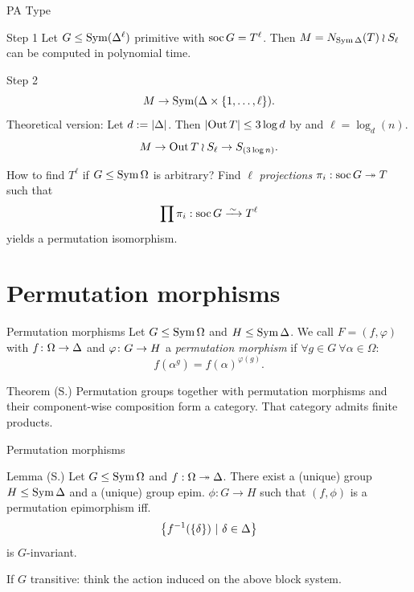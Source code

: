 \documentclass{beamer}
\theoremstyle{plain}
\theoremstyle{definition}
\begin{document}
\begin{frame}{PA Type}
\begin{block}{Step 1}
Let $G \leq \operatorname{Sym}(\Delta ^ \ell)$ primitive with
$\operatorname{soc} G = T ^ \ell$.
Then $M = N_{\operatorname{Sym} \Delta}(T) \wr S_\ell$ can be computed in polynomial
time.
\end{block}
\vspace{1em}

\pause
\begin{block}{Step 2}
\vspace{-1em}
\[
    M \rightarrow \operatorname{Sym}( \Delta \times  \left\{ 1, \ldots, \ell \right\}  ).
\]
\pause
Theoretical version: Let $d :=  \left| \Delta \right| $.
Then $ \left| \operatorname{Out} T \right|  \leq 3 \log d$ by
\cite{guralnick-maroti-pyber:normalizers-primitive-groups}
and $\ell = \log_d(n)$.
\[
    M \rightarrow \operatorname{Out} T \wr S_\ell \rightarrow S_{(3 \log n)}.
\]
\end{block}
\end{frame}

\begin{frame}
How to find $T ^ \ell$ if $G \leq \operatorname{Sym} \Omega$ is arbitrary?
Find $\ell$ \emph{projections} $\pi_i : \operatorname{soc} G \twoheadrightarrow T$
such that
\[
\prod \pi_i : \soc G \iso T ^ \ell
\]
yields a permutation isomorphism.
\end{frame}

\section{Permutation morphisms}
\begin{frame}{Permutation morphisms}
Let $G \leq \operatorname{Sym} \Omega$ and $H \leq \operatorname{Sym} \Delta$.
We call $F = (f, \varphi)$ with
$f \colon \Omega \rightarrow \Delta$
and
$\varphi \colon G \rightarrow H$
a \emph{permutation morphism}
if
$\forall g \in G ~ \forall \alpha \in \Omega :$
\[
    f(\alpha ^ g) = f(\alpha) ^ {\varphi(g)}.
\]

\pause
\begin{block}{Theorem (S.)}
Permutation groups together with permutation morphisms and their component-wise
composition form a category.
That category admits finite products.
\end{block}
\end{frame}

\begin{frame}{Permutation morphisms}
\begin{block}{Lemma (S.)}
Let $G \leq \operatorname{Sym} \Omega$ and $f : \Omega \twoheadrightarrow \Delta$.
There exist a (unique) group $H \leq \operatorname{Sym} \Delta$ and a (unique)
group epim. $\phi : G \to H$ such that
$(f, \phi)$ is a permutation epimorphism
iff.
\[
     \left\{  f ^ {-1}( \left\{ \delta \right\} ) ~|~ \delta \in \Delta  \right\} 
\]
is $G$-invariant.
\end{block}

\pause
If $G$ transitive: think the action induced on the above block system.
\end{frame}
\end{document}
